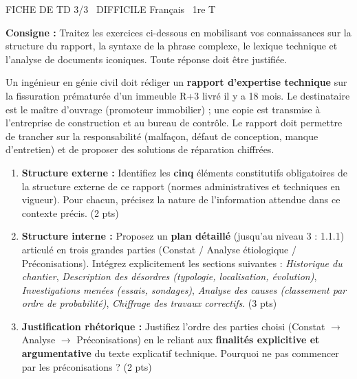 \documentclass[11pt]{article}
\begin{document}
\begin{tcolorbox}[enhanced,colback=popink,colframe=popink,arc=10pt,boxrule=0pt,left=12pt,right=12pt,top=9pt,bottom=9pt]
{\color{white}\popxbold\small FICHE DE TD 3/3 \textbullet\ DIFFICILE \hfill Français \textbullet\ 1re T\par}
\end{tcolorbox}
\vspace{4pt}
\textbf{Consigne :} Traitez les exercices ci-dessous en mobilisant vos connaissances sur la structure du rapport, la syntaxe de la phrase complexe, le lexique technique et l'analyse de documents iconiques. Toute réponse doit être justifiée.

\begin{exercice}
Un ingénieur en génie civil doit rédiger un \textbf{rapport d'expertise technique} sur la fissuration prématurée d'un immeuble R+3 livré il y a 18 mois. Le destinataire est le maître d'ouvrage (promoteur immobilier) ; une copie est transmise à l'entreprise de construction et au bureau de contrôle. Le rapport doit permettre de trancher sur la responsabilité (malfaçon, défaut de conception, manque d'entretien) et de proposer des solutions de réparation chiffrées.

\begin{enumerate}
    \item \textbf{Structure externe :} Identifiez les \textbf{cinq} éléments constitutifs obligatoires de la structure externe de ce rapport (normes administratives et techniques en vigueur). Pour chacun, précisez la nature de l'information attendue dans ce contexte précis. (2 pts)
    \item \textbf{Structure interne :} Proposez un \textbf{plan détaillé} (jusqu'au niveau 3 : 1.1.1) articulé en trois grandes parties (Constat / Analyse étiologique / Préconisations). Intégrez explicitement les sections suivantes : \textit{Historique du chantier}, \textit{Description des désordres (typologie, localisation, évolution)}, \textit{Investigations menées (essais, sondages)}, \textit{Analyse des causes (classement par ordre de probabilité)}, \textit{Chiffrage des travaux correctifs}. (3 pts)
    \item \textbf{Justification rhétorique :} Justifiez l'ordre des parties choisi (Constat $\rightarrow$ Analyse $\rightarrow$ Préconisations) en le reliant aux \textbf{finalités explicitive et argumentative} du texte explicatif technique. Pourquoi ne pas commencer par les préconisations ? (2 pts)
\end{enumerate}
\end{exercice}
\end{document}
